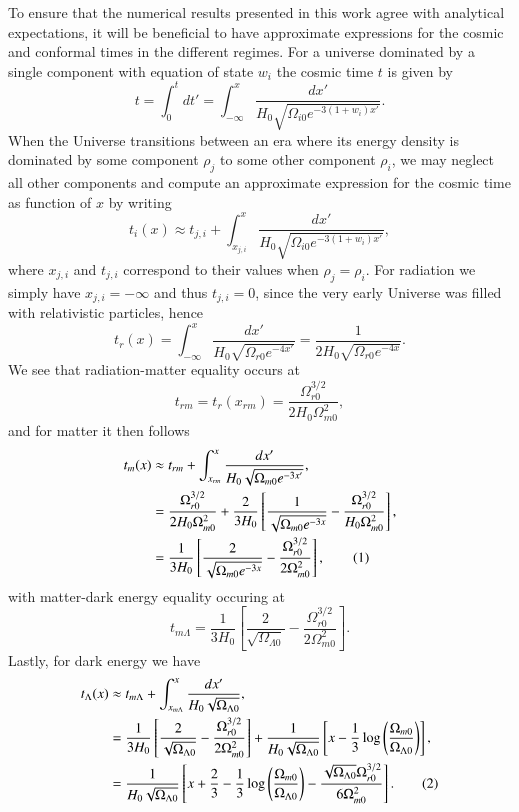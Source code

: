 \documentclass{aa}
\newcommand\numberthis{\addtocounter{equation}{1}\tag{\theequation}}
\begin{document}
To ensure that the numerical results presented in this work agree with analytical expectations, it will be beneficial to have approximate expressions for the cosmic and conformal times in the different regimes. For a universe dominated by a single component with equation of state $w_i$ the cosmic time $t$ is given by
\begin{equation}
  t = \int_0^t dt' = \int_{-\infty}^{x}\frac{dx'}{H_0\sqrt{\Omega_{i0}e^{-3(1+w_i)x'}}}.
\end{equation}
When the Universe transitions between an era where its energy density is dominated by some component $\rho_j$ to some other component $\rho_i$, we may neglect all other components and compute an approximate expression for the cosmic time as function of $x$ by writing
\begin{equation}
  t_i(x) \approx t_{j,i} + \int_{x_{j,i}}^{x}\frac{dx'}{H_0\sqrt{\Omega_{i0}e^{-3(1+w_i)x'}}},
\end{equation}
where $x_{j,i}$ and $t_{j,i}$ correspond to their values when $\rho_j=\rho_i$. For radiation we simply have $x_{j,i}=-\infty$ and thus $t_{j,i}=0$, since the very early Universe was filled with relativistic particles, hence
\begin{equation}
  t_r(x) = \int_{{-\infty}}^{x}\frac{dx'}{H_0\sqrt{\Omega_{r0}e^{-4x'}}} = \frac{1}{2H_0\sqrt{\Omega_{r0}e^{-4x}}}.
\end{equation}
We see that radiation-matter equality occurs at
\begin{equation}
  t_{rm} = t_r(x_{rm}) = \frac{\Omega_{r0}^{3/2}}{2H_0\Omega_{m0}^2},
\end{equation}
and for matter it then follows
\begin{align*}
  t_m(x) &\approx t_{rm} + \int_{x_{rm}}^{x}\frac{dx'}{H_0\sqrt{\Omega_{m0}e^{-3x'}}}, 
  \\
  &= \frac{\Omega_{r0}^{3/2}}{2H_0\Omega_{m0}^2}+\frac{2}{3H_0}\left[\frac{1}{\sqrt{\Omega_{m0}e^{-3x}}} - \frac{\Omega_{r0}^{3/2}}{H_0\Omega_{m0}^2} \right],
  \\
  &= \frac{1}{3H_0}\left[\frac{2}{\sqrt{\Omega_{m0}e^{-3x}}} - \frac{\Omega_{r0}^{3/2}}{2\Omega^2_{m0}} \right], \numberthis
\end{align*}
with matter-dark energy equality occuring at
\begin{equation}
  t_{m\Lambda} = \frac{1}{3H_0}\left[\frac{2}{\sqrt{\Omega_{\Lambda0}}} - \frac{\Omega_{r0}^{3/2}}{2\Omega^2_{m0}} \right].
\end{equation}
Lastly, for dark energy we have
\begin{align*}
  t_\Lambda(x) &\approx t_{m\Lambda} + \int_{x_{m\Lambda}}^{x}\frac{dx'}{H_0\sqrt{\Omega_{\Lambda0}}}, 
  \\
  &= \frac{1}{3H_0}\left[\frac{2}{\sqrt{\Omega_{\Lambda0}}} - \frac{\Omega_{r0}^{3/2}}{2\Omega^2_{m0}} \right] + \frac{1}{H_0\sqrt{\Omega_{\Lambda0}}}\left[x - \frac{1}{3}\log\left(\frac{\Omega_{m0}}{\Omega_{\Lambda0}}\right)\right],
  \\
  &= \frac{1}{H_0\sqrt{\Omega_{\Lambda0}}}\left[x+\frac{2}{3}-\frac{1}{3}\log\left(\frac{\Omega_{m0}}{\Omega_{\Lambda0}}\right)-\frac{\sqrt{\Omega_{\Lambda0}}\Omega_{r0}^{3/2}}{6\Omega^2_{m0}}\right]. \numberthis
\end{align*}
\end{document}
